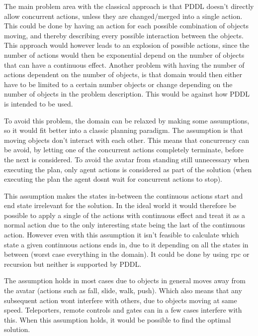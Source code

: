 		The main problem area with the classical approach is that PDDL doesn't directly allow concurrent actions, unless they are changed/merged into a single action. This could be done by having an action for each possible combination of objects moving, and thereby describing every possible interaction between the objects. This approach would however leads to an explosion of possible actions, since the number of actions would then be exponential depend on the number of objects that can have a continuous effect. %
		Another problem with having the number of actions dependent on the number of objects, is that domain would then either have to be limited to a certain number objects or change depending on the number of objects in the problem description. This would be against how PDDL is intended to be used. 
	
		To avoid this problem, the domain can be relaxed by making some assumptions, so it would fit better into a classic planning paradigm. The assumption is that moving objects don't interact with each other. This means that concurrency can be avoid, by letting one of the concurrent actions completely terminate, before the next is considered. To avoid the avatar from standing still unnecessary when executing the plan, only agent actions is considered as part of the solution (when executing the plan the agent dosnt wait for concurrent actions to stop).
		
		This assumption makes the states in-between the continuous actions start and end state irrelevant for the solution. In the ideal world it would therefore be possible to apply a single of the actions with continuous effect and treat it as a normal action due to the only interesting state being the last of the continuous action. However even with this assumption it isn't feasible to calculate which state a given continuous actions ends in, due to it depending on all the states in between (worst case everything in the domain). It could be done by using rpc or recursion but neither is supported by PDDL.
		
		
		The assumption holds in most cases due to objects in general moves away from the avatar (actions such as fall, slide, walk, push). Which also means that any subsequent action wont interfere with others, due to objects moving at same speed. Teleporters, remote controls and gates can in a few cases interfere with this. When this assumption holds, it would be possible to find the optimal solution.
		

